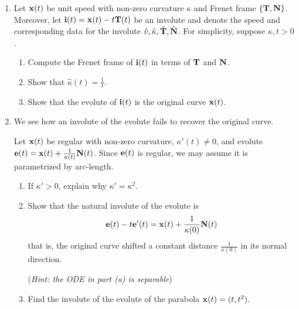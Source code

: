 \begin{exercises}
\begin{enumerate}
	\item Let ${\mathbf{x}}(t)$ be unit speed with non-zero curvature $\kappa$ and Frenet frame $\{{\mathbf{T}},{\mathbf{N}}\}$. Moreover, let ${\mathbf{i}}(t)={\mathbf{x}}(t)-t{\mathbf{T}}(t)$ be an involute and denote the speed and corresponding data for the involute $\hat v,\hat\kappa,\hat{{\mathbf{T}}},\hat{{\mathbf{N}}}$. For simplicity, suppose $\kappa,t>0$.
	\begin{enumerate}
	  \item Compute the Frenet frame of ${\mathbf{i}}(t)$ in terms of ${\mathbf{T}}$ and ${\mathbf{N}}$.
	  
	  \item Show that $\hat\kappa(t)=\frac 1t$.
	  
	  \item Show that the evolute of ${\mathbf{i}}(t)$ is the original curve ${\mathbf{x}}(t)$.
	  
	\end{enumerate}
	
	
	\item We see how an involute of the evolute fails to recover the original curve.\par
	Let ${\mathbf{x}}(t)$ be regular with non-zero curvature, $\kappa'(t)\neq 0$, and evolute ${\mathbf{e}}(t)={\mathbf{x}}(t)+\frac 1{\kappa(t)}{\mathbf{N}}(t)$. Since ${\mathbf{e}}(t)$ is regular, we may assume it is parametrized by arc-length.
	\begin{enumerate}
	  \item If $\kappa'>0$, explain why $\kappa'=\kappa^2$.
	  \item Show that the natural involute of the evolute is
	  \[{\mathbf{e}}(t)-t{\mathbf{e}}'(t)={\mathbf{x}}(t)+\frac 1{\kappa(0)}{\mathbf{N}}(t)\]
	  that is, the original curve shifted a constant distance $\frac 1{\kappa(0)}$ in its normal direction.\par
	  (\emph{Hint: the ODE in part (a) is separable})
	  \item Find the involute of the evolute of the parabola ${\mathbf{x}}(t)=(t,t^2)$. %
	\end{enumerate}	




%   
% 
%   
% 
\end{enumerate}
\end{exercises}





